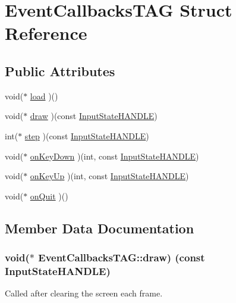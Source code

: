 \hypertarget{struct_event_callbacks_t_a_g}{}\section{Event\+Callbacks\+T\+A\+G Struct Reference}
\label{struct_event_callbacks_t_a_g}
\subsection*{Public Attributes}
\begin{DoxyCompactItemize}
\item 
void($\ast$ \hyperlink{struct_event_callbacks_t_a_g_aafaa4679ab0034c9b118b4e21c2488aa}{load} )()
\item 
void($\ast$ \hyperlink{struct_event_callbacks_t_a_g_ac52265881f5ac874dda4443ff18671c0}{draw} )(const \hyperlink{struct_input_state_t_a_g}{Input\+State\+H\+A\+N\+D\+L\+E})
\item 
int($\ast$ \hyperlink{struct_event_callbacks_t_a_g_a0e1bb533268f270bb6c1b67898666f25}{step} )(const \hyperlink{struct_input_state_t_a_g}{Input\+State\+H\+A\+N\+D\+L\+E})
\item 
void($\ast$ \hyperlink{struct_event_callbacks_t_a_g_ae74b31565dbcbc53896a67d7c678bd04}{on\+Key\+Down} )(int, const \hyperlink{struct_input_state_t_a_g}{Input\+State\+H\+A\+N\+D\+L\+E})
\item 
void($\ast$ \hyperlink{struct_event_callbacks_t_a_g_aa456999060f08075195ba73dc8e6a23e}{on\+Key\+Up} )(int, const \hyperlink{struct_input_state_t_a_g}{Input\+State\+H\+A\+N\+D\+L\+E})
\item 
void($\ast$ \hyperlink{struct_event_callbacks_t_a_g_a7caef22112076592e6192f59df21963e}{on\+Quit} )()
\end{DoxyCompactItemize}


\subsection{Member Data Documentation}
\hypertarget{struct_event_callbacks_t_a_g_ac52265881f5ac874dda4443ff18671c0}{}
\subsubsection[{draw}]{\setlength{\rightskip}{0pt plus 5cm}void($\ast$ Event\+Callbacks\+T\+A\+G\+::draw) (const {\bf Input\+State\+H\+A\+N\+D\+L\+E})}\label{struct_event_callbacks_t_a_g_ac52265881f5ac874dda4443ff18671c0}
Called after clearing the screen each frame. \hypertarget{struct_event_callbacks_t_a_g_aafaa4679ab0034c9b118b4e21c2488aa}{}
